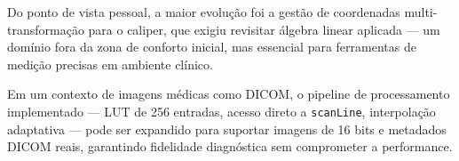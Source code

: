 \documentclass[12pt, a4paper]{article}
\begin{document}
Do ponto de vista pessoal, a maior evolução foi a gestão de coordenadas
multi-transformação para o caliper, que exigiu revisitar álgebra linear
aplicada --- um domínio fora da zona de conforto inicial, mas essencial para
ferramentas de medição precisas em ambiente clínico.

\begin{infobox}[title={Consideração Final}]
  Em um contexto de imagens médicas como DICOM, o pipeline de processamento
  implementado --- LUT de 256 entradas, acesso direto a \texttt{scanLine},
  interpolação adaptativa --- pode ser expandido para suportar imagens de
  16 bits e metadados DICOM reais, garantindo fidelidade diagnóstica sem
  comprometer a performance.
\end{infobox}

\end{document}
